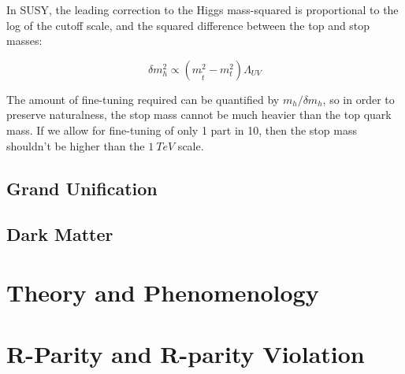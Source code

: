 In SUSY, the leading correction to the Higgs mass-squared is proportional to the log of the cutoff scale,
and the squared difference between the top and stop masses:

\begin{equation}\label{eq:susy_higgs_correction}
    \delta m_h^2 \propto \left(m_{\tilde{t}}^2 - m_t^2\right)  \Lambda_{UV}
\end{equation}\cite{susy-pheno-2000}

The amount of fine-tuning required can be quantified by $m_h / \delta m_h $, so in order to preserve naturalness,
the stop mass cannot be much heavier than the top quark mass.
If we allow for fine-tuning of only 1 part in 10, then the stop mass shouldn't be higher than the $1~TeV$ scale.

\subsection{Grand Unification}\label{subsec:susy_unification}

\subsection{Dark Matter}\label{subsec:susy_dark_matter}

\section{Theory and Phenomenology}\label{sec:susy_theory}

\section{R-Parity and R-parity Violation}\label{sec:susy_rpv}
